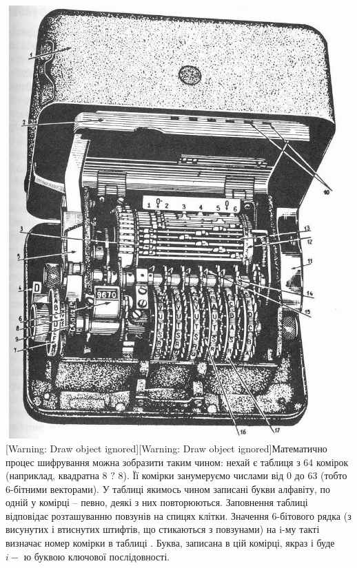\documentclass[a4paper]{article}
\newcounter{}
\begin{document}
\bigskip


\bigskip


\bigskip

 \includegraphics[width=5.6252in,height=6.5555in]{crypt-img/crypt-img77.jpg}
[Warning: Draw object ignored][Warning: Draw object ignored]Математично процес
шифрування можна зобразити таким чином: нехай є таблиця з 64 комірок
(наприклад, квадратна 8 ${?}$ 8). Її комірки занумеруємо числами від 0 до 63
(тобто 6-бітними векторами). У таблиці якимось чином записані букви алфавіту,
по одній у комірці – певно, деякі з них повторюються.  Заповнення таблиці
відповідає розташуванню повзунів на спицях клітки. Значення 6-бітового рядка 
(з висунутих і втиснутих штифтів, що стикаються з повзунами) на i-му такті
визначає номер комірки в таблиці . Буква, записана в цій комірці, якраз і буде 
${i-}$ ю буквою ключової послідовності. 
\end{document}
